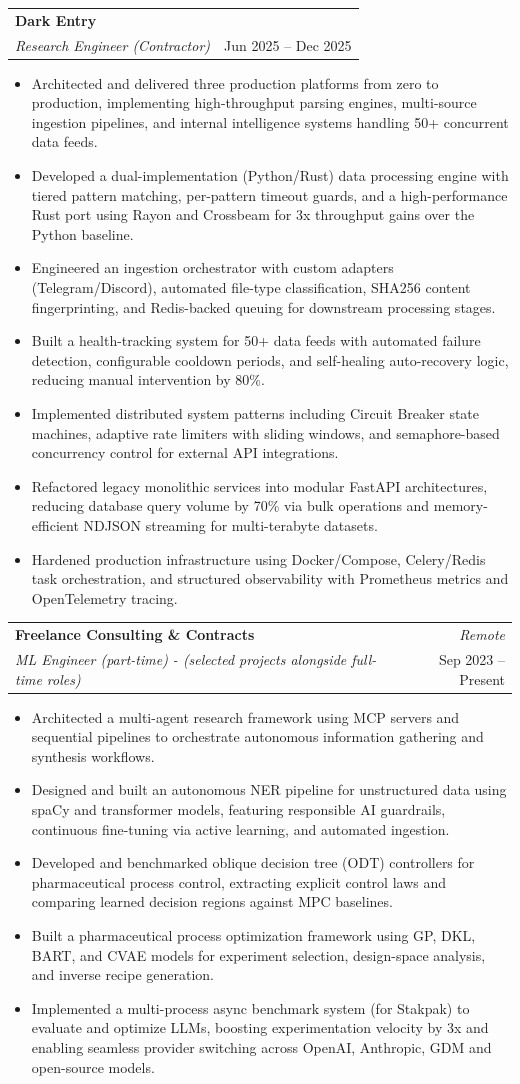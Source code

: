 \documentclass[letterpaper,10pt]{article} %
\makeatletter
\newcommand{\resumeItem}[1]{
  \item\small{#1 \vspace{1pt}} %
}
\newcommand{\resumeSubheading}[4]{
  \vspace{0.25pt}\item %
    \begin{tabular*}{0.98\textwidth}[t]{l@{\extracolsep{\fill}}r}
      \textbf{#1} & \textit{\small #4} \\
      \textit{\small#3} & \small{#2} \\
    \end{tabular*}\vspace{-3pt} %
}
\newcommand{\resumeItemListStart}{\begin{itemize}}
\newcommand{\resumeItemListEnd}{\end{itemize}\vspace{-4pt}} %
\makeatother
\begin{document}
    \resumeSubheading{Dark Entry}{Jun 2025 – Dec 2025}{Research Engineer (Contractor)}{}
    \resumeItemListStart
      \resumeItem{Architected and delivered three production platforms from zero to production, implementing high-throughput parsing engines, multi-source ingestion pipelines, and internal intelligence systems handling 50+ concurrent data feeds.}
      \resumeItem{Developed a dual-implementation (Python/Rust) data processing engine with tiered pattern matching, per-pattern timeout guards, and a high-performance Rust port using Rayon and Crossbeam for 3x throughput gains over the Python baseline.}
      \resumeItem{Engineered an ingestion orchestrator with custom adapters (Telegram/Discord), automated file-type classification, SHA256 content fingerprinting, and Redis-backed queuing for downstream processing stages.}
      \resumeItem{Built a health-tracking system for 50+ data feeds with automated failure detection, configurable cooldown periods, and self-healing auto-recovery logic, reducing manual intervention by 80\%.}
      \resumeItem{Implemented distributed system patterns including Circuit Breaker state machines, adaptive rate limiters with sliding windows, and semaphore-based concurrency control for external API integrations.}
      \resumeItem{Refactored legacy monolithic services into modular FastAPI architectures, reducing database query volume by 70\% via bulk operations and memory-efficient NDJSON streaming for multi-terabyte datasets.}
      \resumeItem{Hardened production infrastructure using Docker/Compose, Celery/Redis task orchestration, and structured observability with Prometheus metrics and OpenTelemetry tracing.}
    \resumeItemListEnd

    \resumeSubheading{Freelance Consulting \& Contracts}{Sep 2023 – Present}{ML Engineer (part-time) - (selected projects alongside full-time roles)}{Remote}
    \resumeItemListStart
        \resumeItem{Architected a multi-agent research framework using MCP servers and sequential pipelines to orchestrate autonomous information gathering and synthesis workflows.}
        \resumeItem{Designed and built an autonomous NER pipeline for unstructured data using spaCy and transformer models, featuring responsible AI guardrails, continuous fine-tuning via active learning, and automated ingestion.}
        \resumeItem{Developed and benchmarked oblique decision tree (ODT) controllers for pharmaceutical process control, extracting explicit control laws and comparing learned decision regions against MPC baselines.}
        \resumeItem{Built a pharmaceutical process optimization framework using GP, DKL, BART, and CVAE models for experiment selection, design-space analysis, and inverse recipe generation.}
        \resumeItem{Implemented a multi-process async benchmark system (for Stakpak) to evaluate and optimize LLMs, boosting experimentation velocity by 3x and enabling seamless provider switching across OpenAI, Anthropic, GDM and open-source models.}
    \resumeItemListEnd
\end{document}
